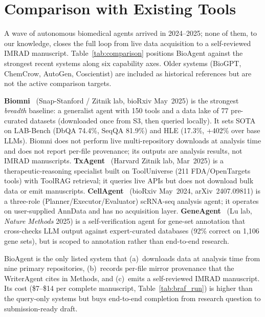 \documentclass[11pt]{article}
\begin{document}
\section{Comparison with Existing Tools}
\label{sec:comparison}

A wave of autonomous biomedical agents arrived in 2024--2025; none of
them, to our knowledge, closes the full loop from live data acquisition
to a self-reviewed IMRAD manuscript.
Table~\ref{tab:comparison} positions BioAgent against the strongest
recent systems along six capability axes. Older systems (BioGPT, ChemCrow,
AutoGen, Coscientist) are included as historical references but are not
the active comparison targets.

\textbf{Biomni}~\cite{biomni2025} (Snap-Stanford / Zitnik lab, bioRxiv
May~2025) is the strongest \emph{breadth} baseline: a generalist agent
with 150 tools and a data lake of 77 pre-curated datasets (downloaded
once from S3, then queried locally). It sets SOTA on LAB-Bench
(DbQA 74.4\%, SeqQA 81.9\%) and HLE (17.3\%, +402\% over base LLMs).
Biomni does not perform live multi-repository downloads at analysis
time and does not report per-file provenance; its outputs are
analysis results, not IMRAD manuscripts.
\textbf{TxAgent}~\cite{txagent2025} (Harvard Zitnik lab, Mar~2025) is a
therapeutic-reasoning specialist built on ToolUniverse (211 FDA/OpenTargets
tools) with ToolRAG retrieval; it queries live APIs but does not download
bulk data or emit manuscripts.
\textbf{CellAgent}~\cite{cellagent2024} (bioRxiv May~2024, arXiv~2407.09811)
is a three-role (Planner/Executor/Evaluator) scRNA-seq analysis agent;
it operates on user-supplied AnnData and has no acquisition layer.
\textbf{GeneAgent}~\cite{geneagent2025} (Lu lab, \emph{Nature Methods}
2025) is a self-verification agent for gene-set annotation that cross-checks
LLM output against expert-curated databases (92\% correct on 1,106 gene
sets), but is scoped to annotation rather than end-to-end research.

BioAgent is the only listed system that (a)~downloads data at analysis time
from nine primary repositories, (b)~records per-file mirror provenance
that the WriterAgent cites in Methods, and (c)~emits a
self-reviewed IMRAD manuscript. Its cost (\$7--\$14 per complete
manuscript, Table~\ref{tab:braf_run}) is higher than the query-only
systems but buys end-to-end completion from research question to
submission-ready draft.
\end{document}
